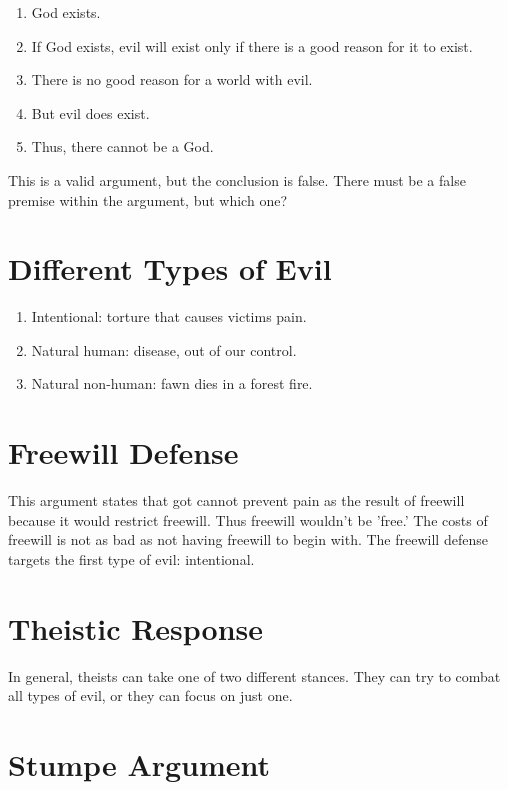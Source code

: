 \documentclass{article}
\begin{document}
\begin{enumerate}
  \item God exists.
  \item If God exists, evil will exist only if there is a good reason for it to
    exist.
  \item There is no good reason for a world with evil.
  \item But evil does exist.
  \item Thus, there cannot be a God.
\end{enumerate}

This is a valid argument, but the conclusion is false. There must be a false
premise within the argument, but which one?

\section{Different Types of Evil}

\begin{enumerate}
  \item Intentional: torture that causes victims pain.
  \item Natural human: disease, out of our control.
  \item Natural non-human: fawn dies in a forest fire.
\end{enumerate}

\section{Freewill Defense}

This argument states that got cannot prevent pain as the result of freewill
because it would restrict freewill. Thus freewill wouldn't be 'free.' The costs
of freewill is not as bad as not having freewill to begin with. The freewill
defense targets the first type of evil: intentional.

\section{Theistic Response}

In general, theists can take one of two different stances. They can try to
combat all types of evil, or they can focus on just one.

\section{Stumpe Argument}
\end{document}
